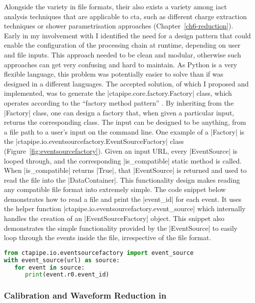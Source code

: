 Alongside the variety in file formats, their also exists a variety among \gls{iact} analysis techniques that are applicable to \gls{cta}, such as different charge extraction techniques or shower parametrisation approaches (Chapter~\ref{ch6-reduction}). Early in my involvement with  I identified the need for a design pattern that could enable the configuration of the processing chain at runtime, depending on user and file inputs. This approach needed to be clean and modular, otherwise such approaches can get very confusing and hard to maintain. As Python is a very flexible language, this problem was potentially easier to solve than if  was designed in a different languages. The accepted solution, of which I proposed and implemented, was to generate the |ctapipe.core.factory.Factory| class, which operates according to the ``factory method pattern'' \cite{johnson2005design}. By inheriting from the |Factory| class, one can design a factory that, when given a particular input, returns the corresponding class. The input can be designed to be anything, from a file path to a user's input on the command line. One example of a |Factory| is the |ctapipe.io.eventsourcefactory.EventSourceFactory| class (Figure~\ref{fig:eventsourcefactory}). Given an input URL, every |EventSource| is looped through, and the corresponding |is_compatible| static method is called. When |is_compatible| returns |True|, that |EventSource| is returned and used to read the file into the |DataContainer|. This functionality design makes reading any compatible file format into  extremely simple. The code snippet below demonstrates how to read a file and print the |event_id| for each event. It uses the helper function |ctapipe.io.eventsourcefactory.event_source| which internally handles the creation of an |EventSourceFactory| object. This snippet also demonstrates the simple functionality provided by the |EventSource| to easily loop through the events inside the file, irrespective of the file format.

\begin{lstlisting}[language=Python]
from ctapipe.io.eventsourcefactory import event_source
with event_source(url) as source:
   for event in source:
      print(event.r0.event_id)
\end{lstlisting}

\subsubsection{Calibration and Waveform Reduction in }

